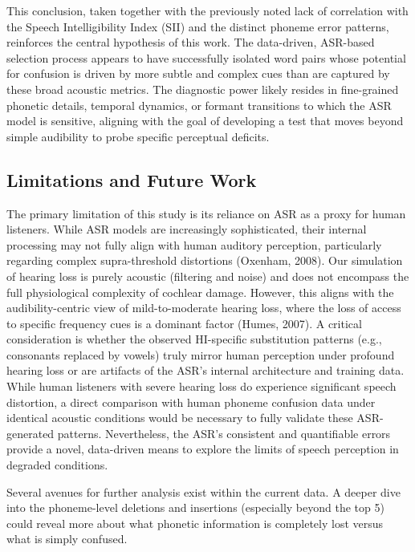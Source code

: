 \documentclass{article}
\begin{document}
This conclusion, taken together with the previously noted lack of correlation with the Speech Intelligibility Index (SII) and the distinct phoneme error patterns, reinforces the central hypothesis of this work. The data-driven, ASR-based selection process appears to have successfully isolated word pairs whose potential for confusion is driven by more subtle and complex cues than are captured by these broad acoustic metrics. The diagnostic power likely resides in fine-grained phonetic details, temporal dynamics, or formant transitions to which the ASR model is sensitive, aligning with the goal of developing a test that moves beyond simple audibility to probe specific perceptual deficits.

\subsection{Limitations and Future Work}
The primary limitation of this study is its reliance on ASR as a proxy for human listeners. While ASR models are increasingly sophisticated, their internal processing may not fully align with human auditory perception, particularly regarding complex supra-threshold distortions (Oxenham, 2008). Our simulation of hearing loss is purely acoustic (filtering and noise) and does not encompass the full physiological complexity of cochlear damage. However, this aligns with the audibility-centric view of mild-to-moderate hearing loss, where the loss of access to specific frequency cues is a dominant factor (Humes, 2007). A critical consideration is whether the observed HI-specific substitution patterns (e.g., consonants replaced by vowels) truly mirror human perception under profound hearing loss or are artifacts of the ASR's internal architecture and training data. While human listeners with severe hearing loss do experience significant speech distortion, a direct comparison with human phoneme confusion data under identical acoustic conditions would be necessary to fully validate these ASR-generated patterns. Nevertheless, the ASR's consistent and quantifiable errors provide a novel, data-driven means to explore the limits of speech perception in degraded conditions.

Several avenues for further analysis exist within the current data. A deeper dive into the phoneme-level deletions and insertions (especially beyond the top 5) could reveal more about what phonetic information is completely lost versus what is simply confused.
\end{document}
